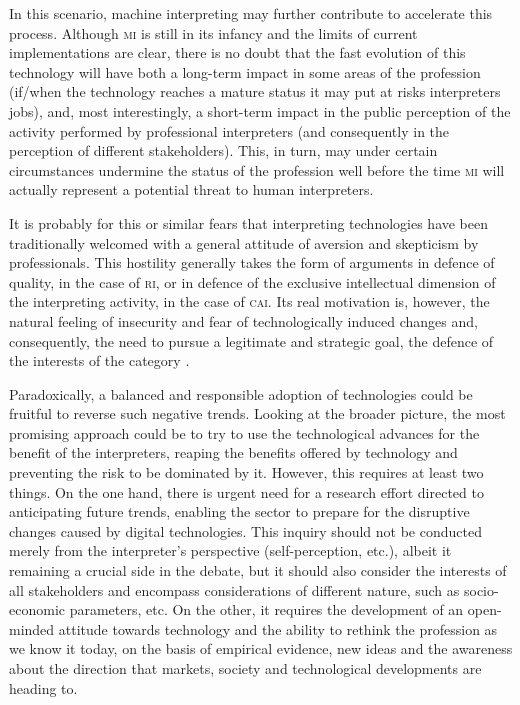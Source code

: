 \documentclass[output=paper]{langsci/langscibook}
\begin{document}
\largerpage 
In this scenario, machine interpreting may further contribute to accelerate this process. Although \textsc{mi} is still in its infancy and the limits of current implementations are clear, there is no doubt that the fast evolution of this technology will have both a long-term impact in some areas of the profession (if/when the technology reaches a mature status it may put at risks interpreters jobs), and, most interestingly, a short-term impact in the public perception of the activity performed by professional interpreters (and consequently in the perception of different stakeholders). This, in turn, may under certain circumstances undermine the status of the profession well before the time  \textsc{mi} will actually represent a potential threat to human interpreters. 

It is probably for this or similar fears that interpreting technologies have been traditionally welcomed with a general attitude of aversion and skepticism by professionals. This hostility generally takes the form of arguments in defence of quality, in the case of \textsc{ri}, or in defence of the exclusive intellectual dimension of the interpreting activity, in the case of \textsc{cai}. Its real motivation is, however, the natural feeling of insecurity and fear of technologically induced changes and, consequently, the need to pursue a legitimate and strategic goal, the defence of the interests of the category \citep{pym_what_2011}. 
 
Paradoxically, a balanced and responsible adoption of technologies could be fruitful to reverse such negative trends. Looking at the broader picture, the most promising approach could be to try to use the technological advances for the benefit of the interpreters, reaping the benefits offered by technology and preventing the risk to be dominated by it. However, this requires at least two things. On the one hand, there is urgent need for a research effort directed to anticipating future trends, enabling the sector to prepare for the disruptive changes caused by digital technologies. This inquiry should not be conducted merely from the interpreter’s perspective (self-perception, etc.), albeit it remaining a crucial side in the debate, but it should also consider the interests of all stakeholders and encompass considerations of different nature, such as socio-economic parameters, etc. On the other, it requires the development of an open-minded attitude towards technology and the ability to rethink the profession as we know it today, on the basis of empirical evidence, new ideas and the awareness about the direction that markets, society and technological developments are heading to.
\end{document}

